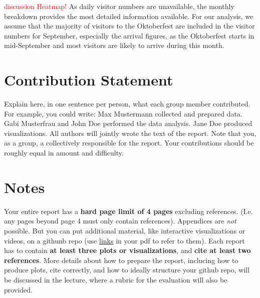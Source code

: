 \documentclass{article}
\theoremstyle{plain}
\theoremstyle{definition}
\theoremstyle{remark}
\begin{document}
\textcolor{red}{discussion Heatmap!}
As daily visitor numbers are unavailable, the monthly breakdown provides the most detailed information available. For our analysis, we assume that the majority of visitors to the Oktoberfest are included in the visitor numbers for September, especially the arrival figures, as the Oktoberfest starts in mid-September and most visitors are likely to arrive during this month.

\section*{Contribution Statement}

Explain here, in one sentence per person, what each group member contributed. For example, you could write: Max Mustermann collected and prepared data. Gabi Musterfrau and John Doe performed the data analysis. Jane Doe produced visualizations. All authors will jointly wrote the text of the report. Note that you, as a group, a collectively responsible for the report. Your contributions should be roughly equal in amount and difficulty.

\section*{Notes} 

Your entire report has a \textbf{hard page limit of 4 pages} excluding references. (I.e. any pages beyond page 4 must only contain references). Appendices are \emph{not} possible. But you can put additional material, like interactive visualizations or videos, on a githunb repo (use \href{https://github.com/pnkraemer/tueplots}{links} in your pdf to refer to them). Each report has to contain \textbf{at least three plots or visualizations}, and \textbf{cite at least two references}. More details about how to prepare the report, inclucing how to produce plots, cite correctly, and how to ideally structure your github repo, will be discussed in the lecture, where a rubric for the evaluation will also be provided.




\end{document}
